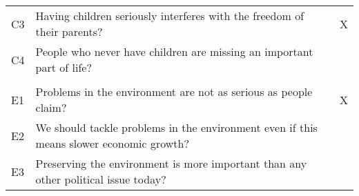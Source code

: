 \begin{tabular}{lll}
\hspace{1em}C3 & Having children seriously interferes with the freedom of their parents? & X\\
\hspace{1em}C4 & People who never have children are missing an important part of life? & \\
\addlinespace[0.3em]
\multicolumn{3}{l}{\textbf{Environment (E)}}\\
\hline
\hspace{1em}E1 & Problems in the environment are not as serious as people claim? & X\\
\hspace{1em}E2 & We should tackle problems in the environment even if this means slower economic growth? & \\
\hspace{1em}E3 & Preserving the environment is more important than any other political issue today? & \\
\bottomrule
\end{tabular}
